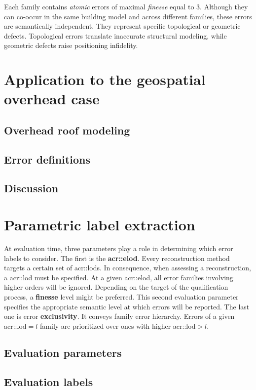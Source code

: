         Each family contains \textit{atomic} errors of maximal \textit{finesse} equal to $3$.
        Although they can co-occur in the same building model and across different families, these errors are semantically independent.
        They represent specific topological or geometric defects.
        Topological errors translate inaccurate structural modeling, while geometric defects raise positioning infidelity.

\section{Application to the geospatial overhead case}
    \subsection{Overhead roof modeling}
    \subsection{Error definitions}
    \subsection{Discussion}

\section{Parametric label extraction}
    At evaluation time, three parameters play a role in determining which error labels to consider.
    The first is the \textbf{\gls{acr::elod}}. Every reconstruction method targets a certain set of \glspl*{acr::lod}.
    In consequence, when assessing a reconstruction, a \gls{acr::lod} must be specified. At a given \gls{acr::elod}, all error families involving higher orders will be ignored.
    Depending on the target of the qualification process, a \textbf{finesse} level might be preferred.
    This second evaluation parameter specifies the appropriate semantic level at which errors will be reported.
    The last one is error \textbf{exclusivity}. It conveys family error hierarchy. Errors of a given \gls{acr::lod}$ = l$ family are prioritized over ones with higher \gls{acr::lod}$ > l$.

    \subsection{Evaluation parameters}
    \subsection{Evaluation labels}

